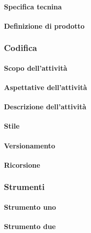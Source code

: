  \paragraph{Specifica tecnina}
 
 \paragraph{Definizione di prodotto}

\subsubsection{Codifica}
 \paragraph{Scopo dell'attività}

 \paragraph{Aspettative dell'attività}
 
 \paragraph{Descrizione dell'attività}
 
 \paragraph{Stile}
 
 \paragraph{Versionamento}
 
 \paragraph{Ricorsione}
 
\subsubsection{Strumenti}
  \paragraph{Strumento uno}

 \paragraph{Strumento due}
 

 
  